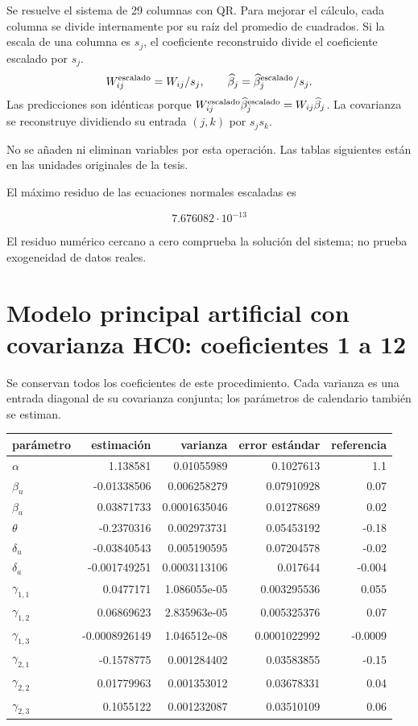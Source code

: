 \documentclass[11pt,a4paper]{article}
\begin{document}
Se resuelve el sistema de 29 columnas con QR. Para mejorar el cálculo, cada columna se divide internamente por su raíz del promedio de cuadrados. Si la escala de una columna es $s_j$, el coeficiente reconstruido divide el coeficiente escalado por $s_j$.
\[
W_{ij}^{\rm escalado}=W_{ij}/s_j,\qquad
\widehat\beta_j=\widehat\beta_j^{\rm escalado}/s_j.
\]
Las predicciones son idénticas porque
$W_{ij}^{\rm escalado}\widehat\beta_j^{\rm escalado}
=W_{ij}\widehat\beta_j$. La covarianza se reconstruye dividiendo su entrada $(j,k)$ por $s_js_k$.

No se añaden ni eliminan variables por esta operación. Las tablas siguientes están en las unidades originales de la tesis.

El máximo residuo de las ecuaciones normales escaladas es

\[
7.676082\cdot10^{-13}
\]

El residuo numérico cercano a cero comprueba la solución del sistema; no prueba exogeneidad de datos reales.

\clearpage
\section{Modelo principal artificial con covarianza HC0: coeficientes 1 a 12}
Se conservan todos los coeficientes de este procedimiento. Cada varianza es una entrada diagonal de su covarianza conjunta; los parámetros de calendario también se estiman.
\begin{center}\small
\begin{tabular}{lrrrr}
\toprule
parámetro & estimación & varianza & error estándar & referencia\\\midrule
$\alpha$ & 1.138581 & 0.01055989 & 0.1027613 & 1.1\\
$\beta_u$ & -0.01338506 & 0.006258279 & 0.07910928 & 0.07\\
$\beta_a$ & 0.03871733 & 0.0001635046 & 0.01278689 & 0.02\\
$\theta$ & -0.2370316 & 0.002973731 & 0.05453192 & -0.18\\
$\delta_u$ & -0.03840543 & 0.005190595 & 0.07204578 & -0.02\\
$\delta_a$ & -0.001749251 & 0.0003113106 & 0.017644 & -0.004\\
$\gamma_{1,1}$ & 0.0477171 & 1.086055e-05 & 0.003295536 & 0.055\\
$\gamma_{1,2}$ & 0.06869623 & 2.835963e-05 & 0.005325376 & 0.07\\
$\gamma_{1,3}$ & -0.0008926149 & 1.046512e-08 & 0.0001022992 & -0.0009\\
$\gamma_{2,1}$ & -0.1578775 & 0.001284402 & 0.03583855 & -0.15\\
$\gamma_{2,2}$ & 0.01779963 & 0.001353012 & 0.03678331 & 0.04\\
$\gamma_{2,3}$ & 0.1055122 & 0.001232087 & 0.03510109 & 0.06\\
\bottomrule
\end{tabular}\end{center}
\end{document}

